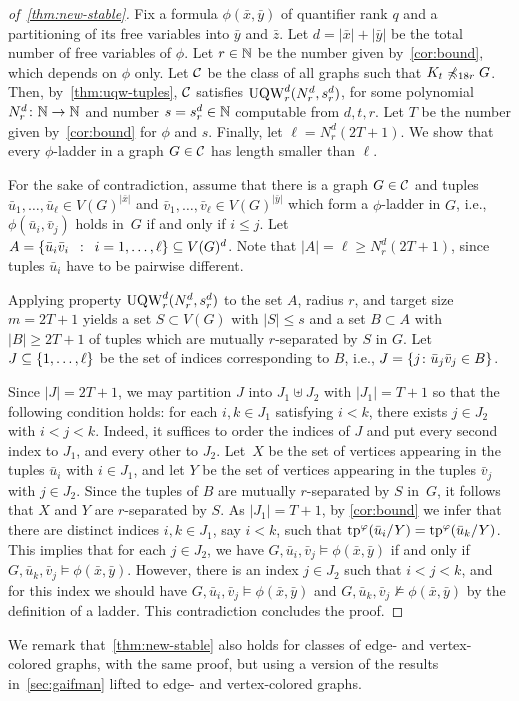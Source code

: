 \begin{proof}[of~\cref{thm:new-stable}]
Fix a formula $\phi(\bar x,\bar y)$ of quantifier rank $q$ and
a partitioning of its 
free variables into  $\bar y$ and $\bar z$.
Let $d=|\bar x|+|\bar y|$ be the total number of free variables of $\phi$.
Let $r\in \N$ be the number given by~\cref{cor:bound},
which depends on $\phi$ only.
Let $\cal C$ be the class of all graphs 
such that  $K_t\not\minor_{18r} G$.
Then, by~\cref{thm:uqw-tuples}, 
$\cal C$ satisfies $\uqw^d_{r}(N^d_{r},s^d_r)$,
for some  polynomial  $N^d_r\from\N\to\N$ and number $s=s^d_r\in \N$ computable from $d,t,r$.
Let $T$ be the number given by~\cref{cor:bound} for $\phi$ and $s$.
 Finally, let 
$\ell=N^d_r(2T+1)$.
We show that 
every $\phi$-ladder in a graph $G\in\cal C$ has length smaller than $\ell$.


For the sake of contradiction, assume that there is a graph $G\in\cal C$
and tuples $\bar u_1,\ldots,\bar u_\ell\in V(G)^{|\bar x|}$ and $ \bar v_1,\ldots, \bar v_\ell\in V(G)^{|\bar y|}$
which form a $\phi$-ladder in $G$, i.e., 
$\phi(\bar u_i,\bar v_j)$ holds in~$G$ if and only if $i\le j$.
	Let $A=\setof{ \bar u_i \bar v_i}{i=1,\ldots,\ell}\subset V(G)^d$. Note that $|A|=\ell\ge N^d_r(2T+1)$, since tuples $\bar u_i$ have to be pairwise different.
  
Applying property  $\uqw^d_r(N^d_r,s^d_r)$ to the set $A$, radius $r$, and target size $m=2T+1$
		 yields a set $S\subset V(G)$ with $|S|\le s$
	and a set $B\subset A$ with $|B|\geq 2T+1$ 
  of tuples which are  mutually $r$-separated by $S$  in $G$.
  Let $J\subseteq \set{1,\ldots,\ell}$
  be the set of indices corresponding to $B$,
  i.e., $J=\set{j\colon\bar u_j\bar v_j\in B}$.
  
  Since $|J|=2T+1$, we may partition $J$ into $J_1\uplus J_2$ with $|J_1|=T+1$ so that the following condition holds:
  for each $i,k\in J_1$ satisfying $i<k$, there exists $j\in J_2$ with $i<j<k$. Indeed, it suffices to order the indices of $J$ and put every second index to $J_1$, and every other to $J_2$.
  Let~$X$ be the set of vertices appearing in the tuples $\bar u_i$ with $i\in J_1$, and let $Y$ be the set of vertices appearing in the tuples $\bar v_j$ with $j\in J_2$.
  Since the tuples of $B$ are mutually $r$-separated by $S$ in~$G$, it follows that $X$ and $Y$ are $r$-separated by $S$.
  As $|J_1|=T+1$, by \cref{cor:bound} we infer that there are distinct indices $i,k\in J_1$, say $i<k$, such that $\tp^\phi(\bar u_i/Y)=
    \tp^\phi(\bar u_{k}/Y)$. This implies that for each $j\in J_2$, we have $G,\bar u_i,\bar v_j\models \phi(\bar x,\bar y)$ if and only if $G,\bar u_{k},\bar v_j\models \phi(\bar x,\bar y)$.
    However, there is an index $j\in J_2$ such that $i<j<k$, and for this index we should have $G,\bar u_i,\bar v_j\models \phi(\bar x,\bar y)$ and $G,\bar u_{k},\bar v_j\not\models \phi(\bar x,\bar y)$
    by the definition of a ladder. This contradiction concludes the proof.
\end{proof}

We remark that~\cref{thm:new-stable} also holds for classes of edge- and vertex-colored graphs, with the same proof, but using 
a version of the results in~\cref{sec:gaifman} lifted to edge- and vertex-colored graphs.
